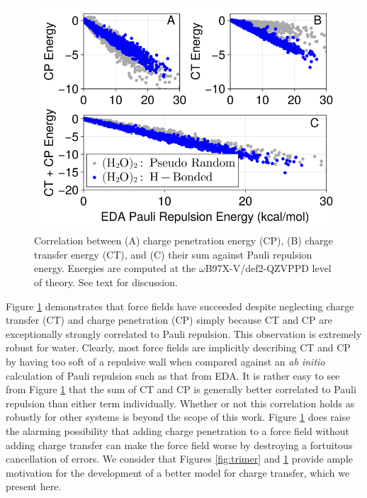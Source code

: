 \documentclass[journal=jacsat,manuscript=article]{achemso}
\begin{document}
\begin{figure}[H]
  \includegraphics*[width=\textwidth]{figures/pauli_ct_cp_correlation.png}
  \caption{Correlation between (A) charge penetration energy (CP), (B) charge transfer energy (CT),
  and (C) their sum against Pauli repulsion energy.
  Energies are computed at the $\omega$B97X-V/def2-QZVPPD level of theory. See text for discussion.}
  \label{fig:cp_ct_pauli}
\end{figure}

Figure \ref{fig:cp_ct_pauli} demonstrates that force fields have succeeded despite neglecting
charge transfer (CT) and charge penetration (CP) simply because CT and CP are exceptionally
strongly correlated to Pauli repulsion. This observation is extremely robust for water. Clearly,
most force fields are implicitly describing CT and CP by having too soft of a repulsive wall
when compared against an \textit{ab initio} calculation of Pauli repulsion such as that from EDA.
It is rather easy to see from Figure \ref{fig:cp_ct_pauli} that the sum
of CT and CP is generally better correlated to Pauli repulsion than either term individually. Whether
or not this correlation holds as robustly for other systems is beyond the scope of this work. Figure
\ref{fig:cp_ct_pauli} does raise the alarming possibility that adding charge penetration to a force field
without adding charge transfer can make the force field worse by destroying a fortuitous cancellation
of errors. We consider that Figures \ref{fig:trimer} and \ref{fig:cp_ct_pauli} provide ample motivation for the
development of a better model for charge transfer, which we present here.
\end{document}
